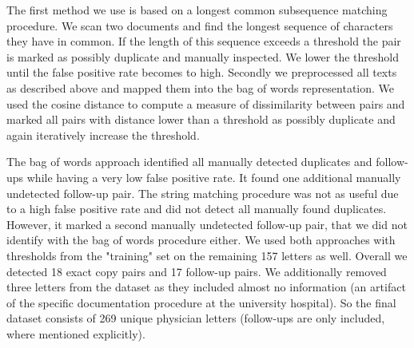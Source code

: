 The first method we use is based on a longest common subsequence matching procedure. We scan two documents and find the longest sequence of characters they have in common. If the length of this sequence exceeds a threshold the pair is marked as possibly duplicate and manually inspected. We lower the threshold until the false positive rate becomes to high. Secondly we preprocessed all texts as described above and mapped them into the bag of words representation. We used the cosine distance to compute a measure of dissimilarity between pairs and marked all pairs with distance lower than a threshold as possibly duplicate and again iteratively increase the threshold.

The bag of words approach identified all manually detected duplicates and follow-ups while having a very low false positive rate. It found one additional manually undetected follow-up pair. The string matching procedure was not as useful due to a high false positive rate and did not detect all manually found duplicates. However, it marked a second manually undetected follow-up pair, that we did not identify with the bag of words procedure either. We used both approaches with thresholds from the "training" set on the remaining 157 letters as well. Overall we detected 18 exact copy pairs and 17 follow-up pairs. We additionally removed three letters from the dataset as they included almost no information (an artifact of the specific documentation procedure at the university hospital). So the final dataset consists of 269 unique physician letters (follow-ups are only included, where mentioned explicitly).





